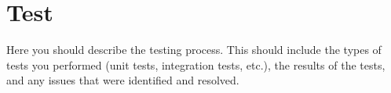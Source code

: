 \section{Test}
Here you should describe the testing process. This should include the types of tests you performed (unit tests, integration tests, etc.), the results of the tests, and any issues that were identified and resolved.